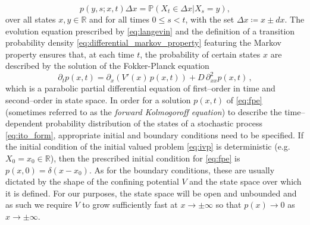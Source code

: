 %
\begin{equation}\label{eq:differential_markov_property}
  p(y,s; x,t)\Delta x = \mathbb{P}(X_t\in\Delta x | X_s = y),
\end{equation}
%
over all states $x,y\in \mathbb{R}$ and for all times $0\leq s<t$, with the set $\Delta x \coloneqq x\pm dx$.
The evolution equation prescribed by \eqref{eq:langevin} and the definition of a transition probability density \eqref{eq:differential_markov_property} featuring the Markov property ensures that, at each time $t$, the probability of certain states $x$ are described by the solution of the Fokker-Planck equation
%
\begin{equation}\label{eq:fpe}
  \partial_{t}p(x,t) = \partial_{x}(V'(x)\,p(x,t)) + D\,\partial_{xx}^{2}p(x,t)\,,
\end{equation}
%
which is a parabolic partial differential equation of first--order in time and second--order in state space.
In order for a solution $p(x,t)$ of \eqref{eq:fpe} (sometimes referred to as the \emph{forward Kolmogoroff equation}) to describe the time--dependent probability distribution of the states of a stochastic process \eqref{eq:ito_form}, appropriate initial and boundary conditions need to be specified.
If the initial condition of the initial valued problem \eqref{eq:ivp} is deterministic (e.g. $X_0 = x_0\in \mathbb{R}$), then the prescribed initial condition for \eqref{eq:fpe} is $p(x,0) = \delta(x-x_0)$.
As for the boundary conditions, these are usually dictated by the shape of the confining potential $V$ and the state space over which it is defined.
For our purposes, the state space will be open and unbounded and as such we require $V$ to grow sufficiently fast at $x\to\pm\infty$ so that $p(x)\to 0$ as $x\to\pm\infty$.

